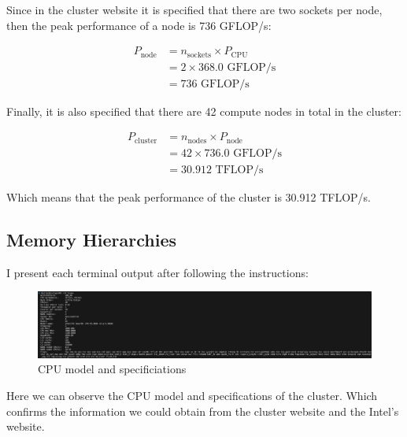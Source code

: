 \documentclass[unicode,11pt,a4paper,oneside,numbers=endperiod,openany]{scrartcl}
\begin{document}
Since in the cluster website it is specified that there are two sockets per node, then the peak performance of a node is 736 GFLOP/s:

\begin{align*}
    P_{\text{node}} &= n_{\text{sockets}} \times P_{\text{CPU}} \\
                    &= 2 \times 368.0 \text{ GFLOP/s} \\
                    &= 736 \text{ GFLOP/s}
\end{align*}

Finally, it is also specified that there are 42 compute nodes in total in the cluster: 

\begin{align*}
    P_{\text{cluster}} &= n_{\text{nodes}} \times P_{\text{node}} \\
                    &= 42 \times 736.0 \text{ GFLOP/s} \\
                    &= 30.912 \text{ TFLOP/s}
\end{align*}

Which means that the peak performance of the cluster is 30.912 TFLOP/s.

\subsection{Memory Hierarchies}
I present each terminal output after following the instructions:

\begin{figure}[H]
    \centering
    \includegraphics[width=\textwidth]{./exercise2/1.png}
    \caption{CPU model and specificiations}
  \end{figure}

Here we can observe the CPU model and specifications of the cluster. 
Which confirms the information we could obtain from the cluster website and the Intel's website.
\end{document}
